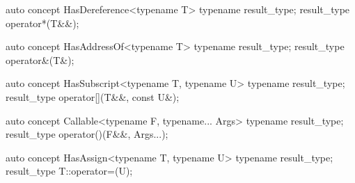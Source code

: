\documentclass[american,twoside]{book}
\begin{document}
\begin{itemdecl}
auto concept HasDereference<typename T> {
  typename result_type;
  result_type operator*(T&&);
}
\end{itemdecl}

\begin{itemdescr}
\pnum
{}
\end{itemdescr}

\begin{itemdecl}
auto concept HasAddressOf<typename T> {
  typename result_type;
  result_type operator&(T&);
}
\end{itemdecl}

\begin{itemdescr}
\pnum
{}
\end{itemdescr}

\begin{itemdecl}
auto concept HasSubscript<typename T, typename U> {
  typename result_type;
  result_type operator[](T&&, const U&);
}
\end{itemdecl}

\begin{itemdescr}
\pnum
{}
\end{itemdescr}

\begin{itemdecl}
auto concept Callable<typename F, typename... Args> {
  typename result_type;
  result_type operator()(F&&, Args...);
}
\end{itemdecl}

\begin{itemdescr}
\pnum 
{}
\end{itemdescr}

\begin{itemdecl}
auto concept HasAssign<typename T, typename U> {
  typename result_type;
  result_type T::operator=(U);
}
\end{itemdecl}

\begin{itemdescr}
\pnum
{}
\end{itemdescr}
\end{document}
